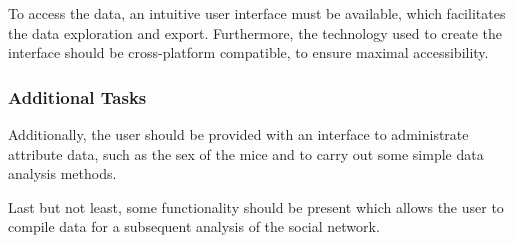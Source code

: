 To access the data, an intuitive user interface must be available, which facilitates the data exploration and export. Furthermore, the technology used to create the interface should be cross-platform compatible, to ensure maximal accessibility.

\subsubsection{Additional Tasks}
\label{subsubsec:additional}
Additionally, the user should be provided with an interface to administrate attribute data, such as the sex of the mice and to carry out some simple data analysis methods.

Last but not least, some functionality should be present which allows the user to compile data for a subsequent analysis of the social network.